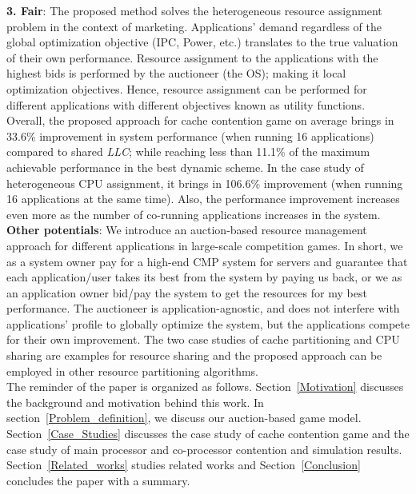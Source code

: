 \indent \textbf{3. Fair}: The proposed method solves the heterogeneous resource assignment problem in the context of marketing. Applications' demand regardless of the global optimization objective (IPC, Power, etc.) translates to the true valuation of their own performance. Resource assignment to the applications with the highest bids is performed by the auctioneer (the OS); making it local optimization objectives. Hence, resource assignment can be performed for different applications with different objectives known as utility functions.\\
\indent Overall, the proposed approach for cache contention game on average brings in 33.6\% improvement in system performance (when running 16 applications) compared to shared \textit{LLC}; while reaching less than 11.1\% of the maximum achievable performance in the best dynamic scheme. In the case study of heterogeneous CPU assignment, it brings in 106.6\% improvement (when running 16 applications at the same time). Also, the performance improvement increases even more as the number of co-running applications increases in the system. \\
\indent \textbf{Other potentials}: We introduce an auction-based resource management approach for different applications in large-scale competition games. In short, we as a system owner pay for a high-end CMP system for servers and guarantee that each application/user takes its best from the system by paying us back, or we as an application owner bid/pay the system to get the resources for my best performance. The auctioneer is application-agnostic, and does not interfere with applications' profile to globally optimize the system, but the applications compete for their own improvement. The two case studies of cache partitioning and CPU sharing are examples for resource sharing and the proposed approach can be employed in other resource partitioning algorithms. \\
\indent The reminder of the paper is organized as follows. Section~\ref{Motivation} discusses the background and motivation behind this work. In section~\ref{Problem_definition}, we discuss our auction-based game model. Section~\ref{Case_Studies} discusses the case study of cache contention game and the case study of main processor and co-processor contention and simulation results. Section~\ref{Related_works} studies related works and Section~\ref{Conclusion} concludes the paper with a summary.
